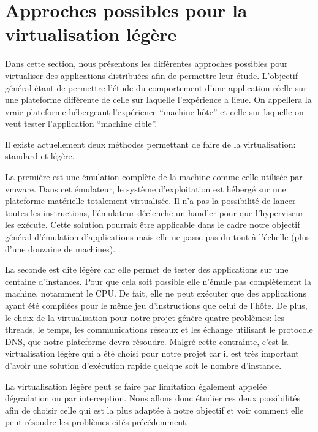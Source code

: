 \section{Approches possibles pour la virtualisation légère}
\label{section:emulation}

Dans cette section, nous présentons les différentes approches possibles pour
virtualiser des applications distribuées afin de permettre leur
étude. L'objectif général étant de permettre l'étude du comportement d'une
application réelle sur une plateforme différente de celle sur laquelle
l'expérience a lieue. On appellera la vraie plateforme hébergeant l'expérience
``machine hôte'' et celle sur laquelle on veut tester l'application ``machine cible''.

Il existe actuellement deux méthodes permettant de faire de la virtualisation:
standard et légère.

La première est une émulation complète de la machine comme celle utilisée par
vmware. Dans cet émulateur, le système d'exploitation est hébergé sur une
plateforme matérielle totalement virtualisée. Il n'a pas la possibilité de
lancer toutes les instructions, l'émulateur déclenche un handler pour que
l'hyperviseur les exécute. Cette solution pourrait être applicable dans le cadre
notre objectif général d'émulation d'applications mais elle ne passe pas du tout
à l'échelle (plus d'une douzaine de machines).

La seconde est dite légère car elle permet de tester des applications sur une
centaine d'instances. Pour que cela soit possible elle n'émule pas complètement
la machine, notamment le CPU. De fait, elle ne peut exécuter que des
applications ayant été compilées pour le même jeu d'instructions que celui de
l'hôte.  De plus, le choix de la virtualisation pour notre projet génère quatre
problèmes: les threads, le temps, les communications réseaux et les échange
utilisant le protocole DNS, que notre plateforme devra résoudre. Malgré cette
contrainte, c'est la virtualisation légère qui a été choisi pour notre projet
car il est très important d'avoir une solution d'exécution rapide quelque soit
le nombre d'instance.

La virtualisation légère peut se faire par limitation également appelée
dégradation ou par interception. Nous allons donc étudier ces deux possibilités
afin de choisir celle qui est la plus adaptée à notre objectif et voir comment
elle peut résoudre les problèmes cités précédemment.










